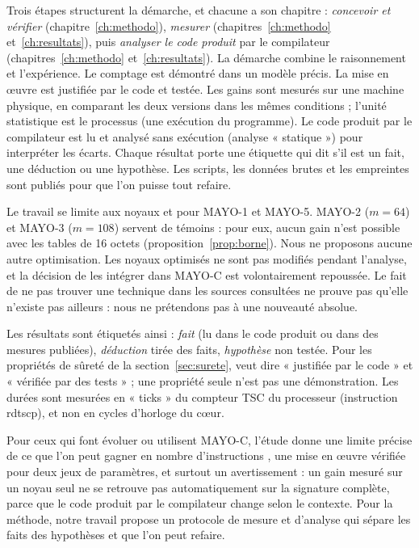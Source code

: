 Trois étapes structurent la démarche, et chacune a son chapitre : \emph{concevoir et vérifier} (chapitre~\ref{ch:methodo}), \emph{mesurer} (chapitres~\ref{ch:methodo} et~\ref{ch:resultats}), puis \emph{analyser le code produit} par le compilateur (chapitres~\ref{ch:methodo} et~\ref{ch:resultats}).
La démarche combine le raisonnement et l'expérience. Le comptage est démontré dans un modèle précis. La mise en œuvre est justifiée par le code et testée. Les gains sont mesurés sur une machine physique, en comparant les deux versions dans les mêmes conditions ; l'unité statistique est le processus (une exécution du programme). Le code produit par le compilateur est lu et analysé sans exécution (analyse « statique ») pour interpréter les écarts. Chaque résultat porte une étiquette qui dit s'il est un fait, une déduction ou une hypothèse. Les scripts, les données brutes et les empreintes sont publiés pour que l'on puisse tout refaire.

Le travail se limite aux noyaux  et  pour MAYO-1 et MAYO-5. MAYO-2 ($m=64$) et MAYO-3 ($m=108$) servent de témoins : pour eux, aucun gain n'est possible avec les tables de 16 octets (proposition~\ref{prop:borne}). Nous ne proposons aucune autre optimisation. Les noyaux optimisés ne sont pas modifiés pendant l'analyse, et la décision de les intégrer dans MAYO-C est volontairement repoussée. Le fait de ne pas trouver une technique dans les sources consultées ne prouve pas qu'elle n'existe pas ailleurs : nous ne prétendons pas à une nouveauté absolue.

Les résultats sont étiquetés ainsi : \F{} \emph{fait} (lu dans le code produit ou dans des mesures publiées), \I{} \emph{déduction} tirée des faits, \Hy{} \emph{hypothèse} non testée. Pour les propriétés de sûreté de la section~\ref{sec:surete}, \Pc{} veut dire « justifiée par le code » et \Pe{} « vérifiée par des tests » ; une propriété \Pe{} seule n'est pas une démonstration. Les durées sont mesurées en « ticks » du compteur TSC du processeur (instruction rdtscp), et non en cycles d'horloge du cœur.

Pour ceux qui font évoluer ou utilisent MAYO-C, l'étude donne une limite précise de ce que l'on peut gagner en nombre d'instructions \vpshufb{}, une mise en œuvre vérifiée pour deux jeux de paramètres, et surtout un avertissement : un gain mesuré sur un noyau seul ne se retrouve pas automatiquement sur la signature complète, parce que le code produit par le compilateur change selon le contexte. Pour la méthode, notre travail propose un protocole de mesure et d'analyse qui sépare les faits des hypothèses et que l'on peut refaire.

